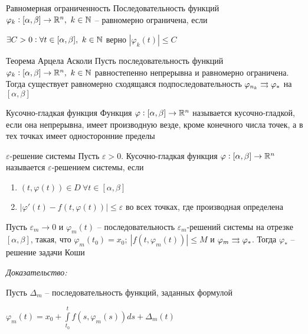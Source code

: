 \documentclass[12pt]{article}
\begin{document}
\begin{defin}{Равномерная ограниченность}
    Последовательность функций $\varphi_k : [\alpha, \beta] \to \mathbb R^n,\ k \in \mathbb N$ -- равномерно ограничена, если

    $\exists C > 0 : \forall t \in [\alpha, \beta],\ k \in \mathbb N$ верно $|\varphi_k(t)| \leq C$
\end{defin}

\begin{theo}{Теорема Арцела Асколи}
    Пусть последовательность функций $\varphi_k : [\alpha, \beta] \to \mathbb R^n,\ k \in \mathbb N$ равностепенно непрерывна и равномерно ограничена. Тогда существует равномерно сходящаяся подпоследовательность $\varphi_{n_k} \rightrightarrows \varphi_*$ на $[\alpha, \beta]$
\end{theo}

\begin{defin}{Кусочно-гладкая функция}
    Функция $\varphi : [\alpha, \beta] \to \mathbb R^n$ называется кусочно-гладкой, если она непрерывна, имеет производную везде, кроме конечного числа точек, а в тех точках имеет односторонние пределы 
\end{defin}

\begin{defin}{$\varepsilon$-решение системы}
    Пусть $\varepsilon > 0$. Кусочно-гладкая функция $\varphi : [\alpha, \beta] \to \mathbb R^n$ называется $\varepsilon$-решением системы, если 

    \begin{enumerate}
        \item $(t, \varphi(t)) \in D\ \forall t \in [\alpha, \beta]$
        \item $|\varphi'(t) - f(t, \varphi(t))| \leq \varepsilon$ во всех точках, где производная определена
    \end{enumerate}
\end{defin}

\begin{lem}{}
    Пусть $\varepsilon_m \to 0$ и $\varphi_m(t)$ -- последовательность $\varepsilon_m$-решений системы на отрезке $[\alpha, \beta]$, такая, что $\varphi_m(t_0) = x_0;\ |f(t, \varphi_m(t))| \leq M$ и $\varphi_m \rightrightarrows \varphi_*$. Тогда $\varphi_*$ -- решение задачи Коши
\end{lem}

\textit{Доказательство:}

Пусть $\Delta_m$ -- последовательность функций, заданных формулой 

$\varphi_m(t) = x_0 + \int\limits_{t_0}^t f(s, \varphi_m(s))ds + \Delta_m(t)$
\end{document}
